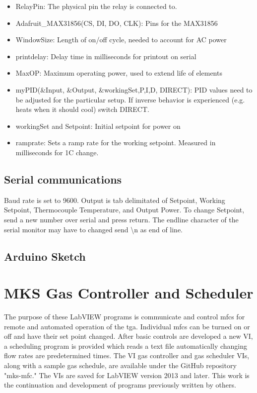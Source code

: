         \begin{itemize}
        \item
          RelayPin: The physical pin the relay is connected to.
        \item
          Adafruit\_MAX31856(CS, DI, DO, CLK): Pins for the MAX31856
        \item
          WindowSize: Length of on/off cycle, needed to account for AC power
        \item
          printdelay: Delay time in milliseconds for printout on serial
        \item
          MaxOP: Maximum operating power, used to extend life of elements
        \item
          myPID(\&Input, \&Output, \&workingSet,P,I,D, DIRECT): PID values need to be adjusted for the particular setup.
          If inverse behavior is experienced (e.g. heats when it should cool) switch DIRECT.
        \item
          workingSet and Setpoint: Initial setpoint for power on
        \item
          ramprate: Sets a ramp rate for the working setpoint. Measured in
          milliseconds for 1C change.
        \end{itemize}

    \subsection{Serial communications}
        Baud rate is set to 9600.
        Output is tab delimitated of Setpoint, Working
        Setpoint, Thermocouple Temperature, and Output Power.
        To change Setpoint, send a new number over serial and press return.
        The endline character of the serial monitor may have to changed send \textbackslash n as end of line.

    \subsection{Arduino Sketch}
        

\section{MKS Gas Controller and Scheduler}
    \label{app:gasvi}
    The purpose of these LabVIEW programs is communicate and control \glspl{mfc} for remote and automated operation of the \gls{tga}.
    Individual \glspl{mfc} can be turned on or off and have their set point changed.
    After basic controls are developed a new VI, a scheduling program is provided which reads a text file automatically changing flow rates are predetermined times.
    The VI gas controller and gas scheduler VIs, along with a sample gas schedule, are available under the GitHub repository "mks-mfc."
    The VIs are saved for LabVIEW version 2013 and later.
    This work is the continuation and development of programs previously written by others.

